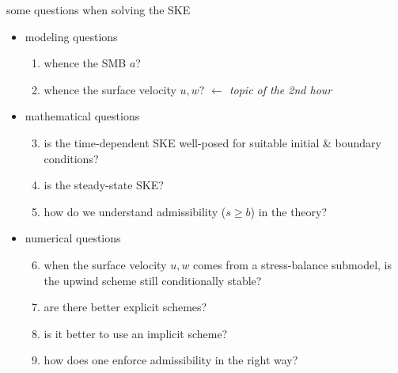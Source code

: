 \documentclass[10pt,dvipsnames]{beamer}
\newcommand{\comm}[1]{{\footnotesize \hfill \emph{#1}}}  %
\begin{document}
\begin{frame}{some questions when solving the SKE}
\begin{itemize}
\item[] \alert{modeling questions}
    \begin{enumerate}
    \item whence the SMB $a$?
    \item whence the surface velocity $u,w$? \comm{$\leftarrow$ topic of the 2nd hour}
    \end{enumerate}
\item[] \alert{mathematical questions}
    \begin{enumerate}\setcounter{enumi}{2}
    \item is the time-dependent SKE well-posed for suitable initial \& boundary conditions?
    \item is the steady-state SKE?
    \item how do we understand admissibility ($s\ge b$) in the theory?
    \end{enumerate}
\item[] \alert{numerical questions}
    \begin{enumerate}\setcounter{enumi}{5}
    \item when the surface velocity $u, w$ comes from a stress-balance submodel, is the upwind scheme still conditionally stable?
    \item are there better explicit schemes?
    \item is it better to use an implicit scheme?
    \item how does one enforce admissibility in the right way?
    \end{enumerate}
\end{itemize}
\end{frame}
\end{document}
